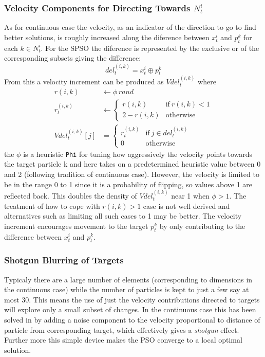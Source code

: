 \documentclass[a4paper,oneside,english]{book}
\numberwithin{equation}{section}
\numberwithin{figure}{section}
\begin{document}
\subsubsection{Velocity Components for Directing Towards $N_t^i$}
As for continuous case the velocity, as an indicator of the direction to go to find better solutions, is roughly increased along the diference between $x_t^i$ and $p_t^k$ for each $k \in  N_t^i$. For the SPSO the diference is represented by the exclusive or of the corresponding subsets giving the difference:
$$del_t^{(i,k)}= x_t^i\oplus p_t^k$$ 
From this a velocity increment can be produced  as $Vdel_t^{(i,k)}$ where  
\begin{align}
\label{randPhi} r(i,k)&\leftarrow\phi\, rand\\
\label{limitPhi}r_t^{(i,k)}&\leftarrow\begin{cases}
r(i,k)& \mathrm{if}\:r(i,k)<1\\
2-r(i,k)& \mathrm{otherwise}
\end{cases}\\
\label{targVel}Vdel_t^{(i,k)}[j]&=\begin{cases}
r_t^{(i,k)}& \mathrm{if}\: j \in del_t^{(i,k)}\\
0 &\mathrm{otherwise}
\end{cases}
\end{align}
the $\phi$ is a heuristic 	\texttt{Phi} for tuning how aggressively the velocity points towards the  target particle k and here takes on a predetermined heuristic value between 0 and 2 (following tradition of continuous case). However, the velocity is limited to be in the range 0 to 1 since it is a probability of flipping, so values above 1 are reflected back. This doubles the density of $Vdel_t^{(i,k)}$ near 1 when  $\phi > 1$. The treatment of how to cope with $r(i,k) >1$ case is not well derived and  alternatives such as limiting all such cases to 1 may be better. The velocity increment encourages movement to the target $p_t^k$ by only contributing to the difference between $x_t^i$ and  $p_t^k$.
\subsubsection{Shotgun Blurring of Targets }
Typicaly there are a large number of elements (corresponding to dimensions in the continuous case) while the number of particles  is kept to just a few say at most 30. This means the use of just the velocity contributions directed to targets will explore only a small subset of changes. In the continuous case this has been solved in \cite{LcRiPSO} by adding a noise component to the velocity proportional to distance of particle from corresponding target, which effectively gives a \emph{shotgun} effect. Further more this simple device makes the PSO converge to a local optimal solution.
\end{document}
